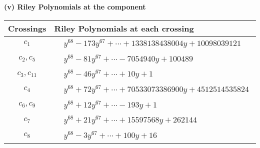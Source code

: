 \documentclass[1p]{elsarticle_modified}
\theoremstyle{definition}
\begin{document}
\newpage\renewcommand{\arraystretch}{1}
\flushleft \textbf{(v) Riley Polynomials at the component}\newline \\
\begin{tabular}{m{50pt}|m{274pt}}
Crossings & \hspace{64pt}Riley Polynomials at each crossing \\
\hline $$\begin{aligned}c_{1}\end{aligned}$$&$\begin{aligned}
&y^{68}-173 y^{67}+\cdots+1338138438004 y+10098039121
\end{aligned}$\\
\hline $$\begin{aligned}c_{2},c_{5}\end{aligned}$$&$\begin{aligned}
&y^{68}-81 y^{67}+\cdots-7054940 y+100489
\end{aligned}$\\
\hline $$\begin{aligned}c_{3},c_{11}\end{aligned}$$&$\begin{aligned}
&y^{68}-46 y^{67}+\cdots+10 y+1
\end{aligned}$\\
\hline $$\begin{aligned}c_{4}\end{aligned}$$&$\begin{aligned}
&y^{68}+72 y^{67}+\cdots+70533073386900 y+4512514535824
\end{aligned}$\\
\hline $$\begin{aligned}c_{6},c_{9}\end{aligned}$$&$\begin{aligned}
&y^{68}+12 y^{67}+\cdots-193 y+1
\end{aligned}$\\
\hline $$\begin{aligned}c_{7}\end{aligned}$$&$\begin{aligned}
&y^{68}+21 y^{67}+\cdots+15597568 y+262144
\end{aligned}$\\
\hline $$\begin{aligned}c_{8}\end{aligned}$$&$\begin{aligned}
&y^{68}-3 y^{67}+\cdots+100 y+16
\end{aligned}$\\

\end{tabular}
\end{document}
